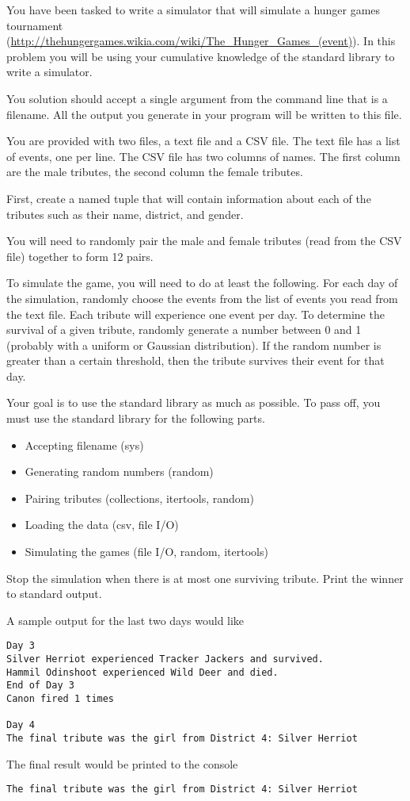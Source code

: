 \begin{problem}
You have been tasked to write a simulator that will simulate a hunger games tournament (\url{http://thehungergames.wikia.com/wiki/The_Hunger_Games_(event)}).
In this problem you will be using your cumulative knowledge of the standard library to write a simulator.

You solution should accept a single argument from the command line that is a filename.  All the output you generate in your program will be written to this file.

You are provided with two files, a text file and a CSV file.
The text file has a list of events, one per line.
The CSV file has two columns of names.
The first column are the male tributes, the second column the female tributes.

First, create a named tuple that will contain information about each of the tributes such as their name, district, and gender.

You will need to randomly pair the male and female tributes (read from the CSV file) together to form 12 pairs.

To simulate the game, you will need to do at least the following.
For each day of the simulation, randomly choose the events from the list of events you read from the text file.
Each tribute will experience one event per day.
To determine the survival of a given tribute, randomly generate a number between 0 and 1 (probably with a uniform or Gaussian distribution).  If the random number is greater than a certain threshold, then the tribute survives their event for that day.

Your goal is to use the standard library as much as possible.
To pass off, you must use the standard library for the following parts.
\begin{itemize}
\item Accepting filename (sys)
\item Generating random numbers (random)
\item Pairing tributes (collections, itertools, random)
\item Loading the data (csv, file I/O)
\item Simulating the games (file I/O, random, itertools)
\end{itemize}

Stop the simulation when there is at most one surviving tribute.
Print the winner to standard output.

A sample output for the last two days would like
\begin{lstlisting}[style=ShellOutput]
Day 3
Silver Herriot experienced Tracker Jackers and survived.
Hammil Odinshoot experienced Wild Deer and died.
End of Day 3
Canon fired 1 times

Day 4
The final tribute was the girl from District 4: Silver Herriot
\end{lstlisting}
The final result would be printed to the console
\begin{lstlisting}[style=ShellOutput]
The final tribute was the girl from District 4: Silver Herriot
\end{lstlisting}
\end{problem}

